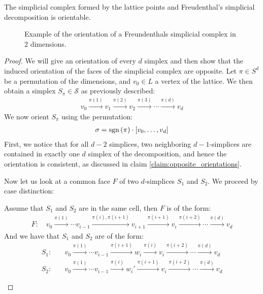 \begin{claim}
	The simplicial complex formed by the lattice points and Freudenthal's simplicial decomposition is orientable.
\end{claim}

\begin{figure}[ht]
	\centering
	\caption[Orientation of a simplicial complex]{Example of the orientation of a Freundenthals simplicial complex in 2 dimensions.}
	\label{fig:orientation_of_simplicial_complex}
\end{figure}

\begin{proof}
	We will give an orientation of every $d$ simplex and then show that the induced orientation of the faces of the simplicial complex are opposite.
	Let $\pi \in S^d$ be a permutation of the dimensions, and $v_0 \in L$ a vertex of the lattice. We then obtain a simplex $S_{\pi} \in \mathcal{S}$ as previously described:
	\begin{align*}
		v_0 \xrightarrow{\pi(1)} v_1 \xrightarrow{\pi(2)} v_2 \xrightarrow{\pi(3)} \cdots \xrightarrow{\pi(d)} v_d
	\end{align*}
	We now orient $S_{\pi}$ using the permutation:
	\begin{align*}
		\sigma = \operatorname{sgn}\left(\pi\right) \cdot [v_0, \dots, v_d]
	\end{align*}
	First, we notice that for all $d-2$ simplices, two neighboring $d-1$-simplices are contained in exactly one $d$ simplex of the decomposition, and hence the orientation is consistent, as discussed in claim \ref{claim:opposite_orientations}. \par
	Now let us look at a common face $F$ of two $d$-simplices $S_1$ and $S_2$. We proceed by case distinction:
	\begin{case}{1}
		Assume that $S_1$ and $S_2$ are in the same cell, then $F$ is of the form:
		\begin{align*}
			F: \quad v_0 \xrightarrow{\pi(1)}  \cdots v_{i-1} \xrightarrow{\pi(i), \pi(i+1)} v_{i+1} \xrightarrow{\pi(i+1)} v_{i} \xrightarrow{\pi(i+2)} \cdots \xrightarrow{\pi(d)} v_d
		\end{align*}
		And we have that $S_1$ and $S_2$ are of the form:
		\begin{align*}
			S_1: \quad & v_0 \xrightarrow{\pi(1)} \cdots v_{i-1} \xrightarrow{\pi(i+1)} w_i \xrightarrow{\pi(i)} v_{i} \xrightarrow{\pi(i+2)} \cdots \xrightarrow{\pi(d)} v_d  \\
			S_2: \quad & v_0 \xrightarrow{\pi(1)} \cdots v_{i-1} \xrightarrow{\pi(i)} w_i' \xrightarrow{\pi(i+1)} v_{i} \xrightarrow{\pi(i+2)} \cdots \xrightarrow{\pi(d)} v_d

\end{align*}
\end{case}
\end{proof}

